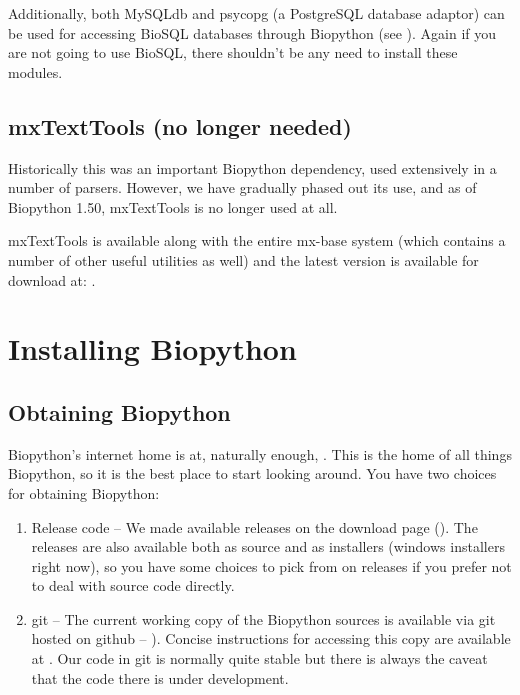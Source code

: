 \documentclass{article}
\begin{document}
Additionally, both MySQLdb and psycopg (a PostgreSQL database adaptor)
can be used for accessing BioSQL databases through Biopython
(see ). Again if
you are not going to use BioSQL, there shouldn't be any need to install
these modules.

\subsection{mxTextTools (no longer needed)}

Historically this was an important Biopython dependency, used extensively
in a number of parsers.  However, we have gradually phased out its use,
and as of Biopython 1.50, mxTextTools is no longer used at all.

mxTextTools is available along with the entire mx-base system (which
contains a number of other useful utilities as well) and the latest
version is available for download at:
.

\section{Installing Biopython}

\subsection{Obtaining Biopython}
Biopython's internet home is at, naturally enough,  
. This is the home of all things 
Biopython, so it is the best place to start looking around. 
You have two choices for obtaining Biopython:

\begin{enumerate}

\item Release code -- We made available releases on the download page 
(). 
The releases are also available both as source and as installers 
(windows installers right now), so you have some choices to pick from 
on releases if you prefer not to deal with source code directly.

\item git -- The current working copy of the Biopython sources is available
via git hosted on github  -- ).
Concise instructions for accessing this copy are available at
. Our code in git
is normally quite stable but there is always the caveat that the code
there is under development.

\end{enumerate}
\end{document}
